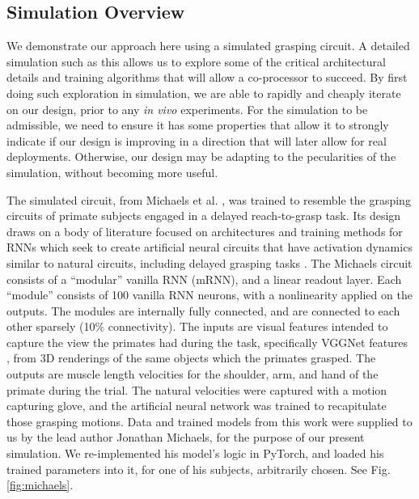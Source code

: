 \documentclass[12pt]{iopart}
\begin{document}
\subsection{Simulation Overview}
We demonstrate our approach here using a simulated grasping circuit.
A detailed simulation such as this allows us to explore some of the critical
architectural details and training algorithms that will allow a co-processor
to succeed.  By first doing such exploration in simulation, we are able to
rapidly and cheaply iterate on our design, prior to any \textit{in vivo}
experiments. For the simulation to be admissible, we need to ensure it has some
properties that allow it to strongly indicate if our design is improving in
a direction that will later allow for real deployments. Otherwise, our
design may be adapting to the pecularities of the simulation, without
becoming more useful.

The simulated circuit, from Michaels et al. \cite{michaels.mrnn}, was trained
to resemble the grasping circuits of primate subjects engaged in a delayed reach-to-grasp task.
Its design draws on a body of literature focused on architectures and training methods for RNNs which
seek to create artificial neural circuits that have activation dynamics similar to natural circuits,
including delayed grasping tasks \cite{susillo.mrnn}. The Michaels circuit consists of a
``modular'' vanilla RNN (mRNN), and a linear readout layer. Each ``module'' consists of 100 vanilla
RNN neurons, with a nonlinearity applied on the outputs. The modules are internally fully connected,
and are connected to each other sparsely (10\% connectivity). The inputs are visual features
intended to capture the view the primates had during the task, specifically VGGNet features \cite{simonyan.vgg},
from 3D renderings of the same objects which the primates grasped. The outputs are muscle length
velocities for the shoulder, arm, and hand of the primate during the trial. The natural
velocities were captured with a motion capturing glove, and the artificial neural network
was trained to recapitulate those grasping motions. Data and trained models from this work
were supplied to us by the lead author Jonathan Michaels, for the purpose of our present
simulation. We re-implemented his model's logic in PyTorch, and loaded his trained parameters
into it, for one of his subjects, arbitrarily chosen. See Fig. \ref{fig:michaels}.
\end{document}
